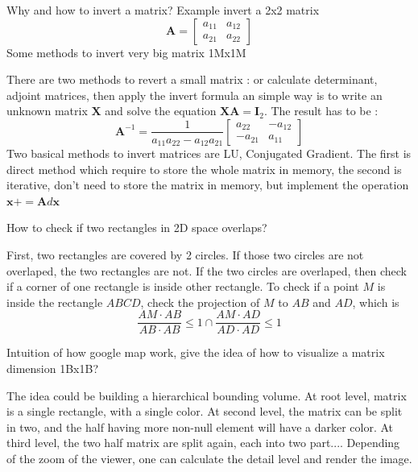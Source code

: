 \documentclass{exam}%
\newcommand{\mathvec}[1]{\textbf{#1}}
\begin{document}
\begin{questions}
\question Why and how to invert a matrix? Example invert a 2x2 matrix 
\[
\mathvec{A}=
\left[ 
\begin{array}{cc}
a_{11} & a_{12}\\
a_{21} & a_{22}
\end{array} 
\right]
\]
Some methods to invert very big matrix 1Mx1M
\begin{solution}[.2in]
There are two methods to revert a small matrix : or calculate determinant, adjoint matrices, then apply the invert formula an simple way is to write an unknown matrix $\mathvec{X}$ and solve the equation $\mathvec{X}\mathvec{A}=\mathvec{I}_2$. The result has to be :
\[
\mathvec{A}^{-1}=
\frac{1}{a_{11}a_{22}-a_{12}a_{21}}
\left[ 
\begin{array}{cc}
a_{22} & -a_{12}\\
-a_{21} & a_{11}
\end{array} 
\right]
\]
Two basical methods to invert matrices are LU, Conjugated Gradient. The first is direct method which require to store the whole matrix in memory, the second is iterative, don't need to store the matrix in memory, but implement the operation $\mathvec{x}+=\mathvec{A}d\mathvec{x}$
\end{solution}

\question How to check if two rectangles in 2D space overlaps?
\begin{solution}[.2in]
First, two rectangles are covered by 2 circles. If those two circles are not overlaped, the two rectangles are not. If the two circles are overlaped, then check if a corner of one rectangle is inside other rectangle. To check if a point $M$ is inside the rectangle $ABCD$, check the projection of $M$ to $AB$ and $AD$, which is 
\[
\frac{AM \cdot AB}{AB \cdot AB} \leq 1  
\cap 
\frac{AM \cdot AD}{AD \cdot AD} \leq 1  
\]
\end{solution}

\question Intuition of how google map work, give the idea of how to visualize a matrix dimension 1Bx1B?
\begin{solution}[.2in]
The idea could be building a hierarchical bounding volume. At root level, matrix is a single rectangle, with a single color. At second level, the matrix can be split in two, and the half having more non-null element will have a darker color. At third level, the two half matrix are split again, each into two part.... Depending of the zoom of the viewer, one can calculate the detail level and render the image.
\end{solution}


\end{questions}
\end{document}

